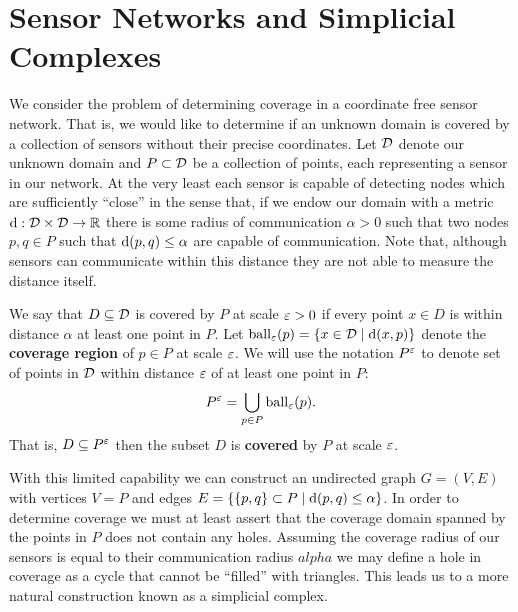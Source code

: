 \section{Sensor Networks and Simplicial Complexes} %
\label{sec:complexes}

We consider the problem of determining coverage in a coordinate free sensor network.
That is, we would like to determine if an unknown domain is covered by a collection of sensors without their precise coordinates.
Let ${\mathcal{D}}$ denote our unknown domain and $P\subset{\mathcal{D}}$ be a collection of points, each representing a sensor in our network.
At the very least each sensor is capable of detecting nodes which are sufficiently ``close'' in the sense that, if we endow our domain with a metric $\mathrm{d}:{\mathcal{D}}\times{\mathcal{D}}\to\mathbb{R}$ there is some radius of communication $\alpha > 0$ such that two nodes $p, q\in P$ such that $\mathrm{d}(p, q) \leq\alpha$ are capable of communication.
Note that, although sensors can communicate within this distance they are not able to measure the distance itself.

We say that $D\subseteq{\mathcal{D}}$ is covered by $P$ at scale $\varepsilon > 0$ if every point $x\in D$ is within distance $\alpha$ at least one point in $P$.
Let $\mathrm{ball}_\varepsilon(p) = \{x\in{\mathcal{D}}\mid \mathrm{d}(x, p)\}$ denote the \textbf{coverage region} of $p\in P$ at scale $\varepsilon$.
We will use the notation $P^\varepsilon$ to denote set of points in ${\mathcal{D}}$ within distance $\varepsilon$ of at least one point in $P$:
\[ P^\varepsilon = \bigcup_{p\in P}\mathrm{ball}_\varepsilon(p). \]
That is, $D\subseteq P^\varepsilon$ then the subset $D$ is \textbf{covered} by $P$ at scale $\varepsilon$.

With this limited capability we can construct an undirected graph $G=(V,E)$ with vertices $V=P$ and edges $E = \{\{p, q\}\subset P\mid \mathrm{d}(p,q)\leq\alpha\}$.
In order to determine coverage we must at least assert that the coverage domain spanned by the points in $P$ does not contain any holes.
Assuming the coverage radius of our sensors is equal to their communication radius $alpha$ we may define a hole in coverage as a cycle that cannot be ``filled'' with triangles.
This leads us to a more natural construction known as a simplicial complex.

